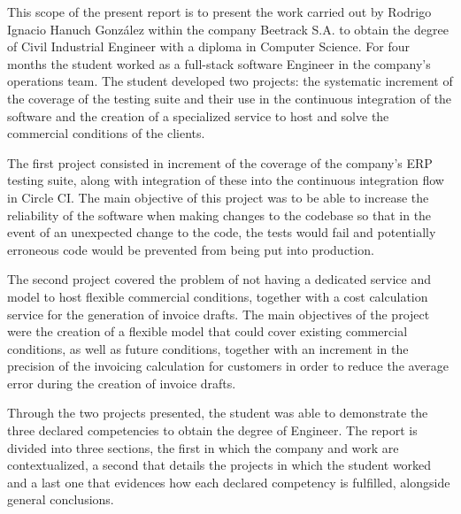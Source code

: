 This scope of the present report is to present the work carried out by Rodrigo Ignacio Hanuch González within the company Beetrack S.A. to obtain  the degree of Civil Industrial Engineer with a diploma in Computer Science. For four months the student worked as a full-stack software Engineer in the company's operations team. The student developed two projects: the systematic increment of the coverage of the testing suite and their use in the continuous integration of the software and the creation of a specialized service to host and solve the commercial conditions of the clients.

The first project consisted in increment of the coverage of the company's ERP testing suite, along with integration of these into the continuous integration flow in Circle CI. The main objective of this project was to be able to increase the reliability of the software when making changes to the codebase so that in the event of an unexpected change to the code, the tests would fail and potentially erroneous code would be prevented from being put into production.

The second project covered the problem of not having a dedicated service and model to host flexible commercial conditions, together with a cost calculation service for the generation of invoice drafts. The main objectives of the project were the creation of a flexible model that could cover existing commercial conditions, as well as future conditions, together with an increment in the precision of the invoicing calculation for customers in order to reduce the average error during the creation of invoice drafts.

Through the two projects presented, the student was able to demonstrate the three declared competencies to obtain the degree of Engineer. The report is divided into three sections, the first in which the company and work are contextualized, a second that details the projects in which the student worked and a last one that evidences how each declared competency is fulfilled, alongside general conclusions.